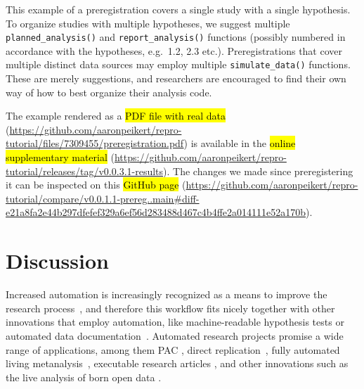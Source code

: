 \documentclass[psych,tutorial,accept,moreauthors,pdftex]{Definitions/mdpi}
\begin{document}
\begin{paracol}{2}
\switchcolumn


This example of a preregistration covers a single study with a single
hypothesis. To organize studies with multiple hypotheses, we suggest
multiple \texttt{planned\_analysis()} and \texttt{report\_analysis()}
functions (possibly numbered in accordance with the hypotheses,
e.g.~1.2, 2.3 etc.). Preregistrations that cover multiple distinct data
sources may employ multiple \texttt{simulate\_data()} functions. These
are merely suggestions, and researchers are encouraged to find their own
way of how to best organize their analysis code.

The example rendered as a \hl{PDF file with real data}
(\url{https://github.com/aaronpeikert/repro-tutorial/files/7309455/preregistration.pdf}) is available in the \hl{online supplementary material}
(\url{https://github.com/aaronpeikert/repro-tutorial/releases/tag/v0.0.3.1-results}). The changes we made since preregistering it can
be inspected on this \hl{GitHub page}
(\url{https://github.com/aaronpeikert/repro-tutorial/compare/v0.0.1.1-prereg..main\#diff-e21a8fa2e44b297dfefef329a6ef56d283488d467c4b4ffe2a014111e52a170b}).

\section{Discussion}\label{discussion}

Increased automation is increasingly recognized as a means to improve
the research process~\citep{rouderMinimizingMistakesPsychological2019},
and therefore this workflow fits nicely together with other innovations
that employ automation, like machine-readable hypothesis tests
\citep{lakensImprovingTransparencyFalsifiability2021} or automated data
documentation~\citep{arslanHowAutomaticallyDocument2019}. Automated
research projects promise a wide range of applications, among them PAC
\citep[potentially to be submitted as a registered
report][]{nosekRegisteredReports2014, chambersWhatNextRegistered2019},
direct replication~\citep{simonsValueDirectReplication2014}, fully
automated living metanalysis~\citep{elliottLivingSystematicReviews2014},
executable research articles
\citep{elifesciencespublicationsELifeLaunchesExecutable2020}, and other
innovations such as the live analysis of born open data
\citep{rouderWhatWhyHow2016, kekecsRaisingValueResearch2019}.


\end{paracol}
\end{document}
